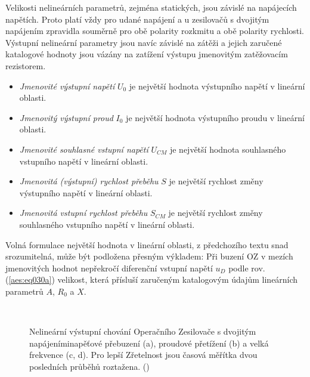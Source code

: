      Velikosti nelineárních parametrů, zejména statických, jsou závislé na napájecích napětích.
      Proto platí vždy pro udané napájení a u zesilovačů s dvojitým napájením zpravidla souměrně pro
      obě polarity rozkmitu a obě polarity rychlosti. Výstupní nelineární parametry jsou navíc
      závislé na zátěži a jejich zaručené katalogové hodnoty jsou vázány na zatížení výstupu
      jmenovitým zatěžovacím rezistorem.
      \begin{itemize}[noitemsep]
        \item \emph{Jmenovité výstupní napětí} \(U_0\) je největší hodnota výstupního napětí v
              lineární oblasti.         
        \item \emph{Jmenovitý výstupní proud} \(I_0\) je největší hodnota výstupního proudu v
              lineární oblasti. 
        \item \emph{Jmenovité souhlasné vstupní napětí} \(U_{CM}\) je největší hodnota souhlasného
              vstupního napětí v lineární oblasti.
        \item \emph{Jmenovitá (výstupní) rychlost přeběhu} \(S\) je největší rychlost změny
              výstupního napětí v lineární oblasti.
        \item \emph{Jmenovitá vstupní rychlost přeběhu} \(S_{CM}\) je největší rychlost změny
              souhlasného vstupního napětí v lineární oblasti.        
      \end{itemize}

      Volná formulace největší hodnota v lineární oblasti, z předchozího textu snad srozumitelná,
      může být podložena přesným výkladem: Při buzení OZ v mezích jmenovitých hodnot nepřekročí
      diferenční vstupní napětí \(u_D\) podle rov. (\ref{aes:eq030a}) velikost, která přísluší
      zaručeným katalogovým údajům lineárních parametrů \(A\), \(R_0\) a \(X\).

      \begin{figure}[ht!]  %
        \centering
          {}
        \hspace{1em}                                                       
          {}         \\                                                    
          {}         \hspace{1em}                                                       
          {}                                   
        \caption{Nelineární výstupní chování Operačního Zesilovače s dvojitým napájeníminapěťové
                přebuzení (a), proudové přetížení (b) a velká frekvence (c, d). Pro lepší Zřetelnost
                jsou časová měřítka dvou posledních průběhů roztažena. (\cite[s.~31]{Dostal})}
                \label{aes:fig058}
      \end{figure}

